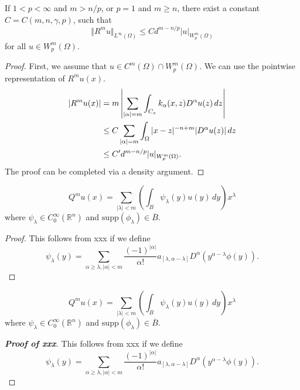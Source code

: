 \documentclass[fontset=none]{ctexart}
\begin{document}
\begin{theorem*}
    If $1<p<\infty$ and $m > n/p$, or $p=1$ and $m \ge n$, there exist a constant $C = C(m,n,\gamma,p)$, such that
    \begin{equation*}
        \Vert R^m u \Vert_{L^\infty(\Omega)} \le C d^{m-n/p} |u|_{W^m_p(\Omega)}
    \end{equation*}
    for all $u \in W^m_p(\Omega)$.
\end{theorem*}
\begin{proof}
    First, we assume that $u \in C^m(\Omega) \cap W^m_p(\Omega)$. We can use the pointwise representation of $R^mu(x)$.
    \begin{align*}
        |R^mu(x)| ={} & m \left| \sum_{|\alpha| = m} \int_{C_x} k_{\alpha}(x,z) D^\alpha u(z)\,dz \right| \notag \\
        \le{}         & C \sum_{|\alpha|=m} \int_{\Omega} |x-z|^{-n+m} |D^\alpha u(z)|\,dz \notag                \\
        \le{}         & C' d^{m-n/p} |u|_{W^m_p(\Omega)}.
    \end{align*}
    The proof can be completed via a density argument.
\end{proof}

\begin{proposition}
    \begin{equation*}
        Q^m u(x) = \sum_{|\lambda| < m} \left( \int_B \psi_\lambda(y) u(y)\,dy \right) x^\lambda
    \end{equation*}
    where $\psi_\lambda \in C_0^\infty(\mathbb{R}^n)$ and $\mathrm{supp}(\phi_\lambda) \in \overline{B}$.
\end{proposition}
\begin{proof}
    This follows from xxx if we define
    \begin{equation*}
        \psi_\lambda(y) = \sum_{\alpha \ge \lambda,|\alpha|<m}
        \frac{(-1)^{|\alpha|}}{\alpha !} a_{[\lambda,\alpha-\lambda]} D^\alpha(y^{\alpha-\lambda} \phi(y)).
    \end{equation*}
\end{proof}

\begin{proposition}[xxx]
    \begin{equation*}
        Q^m u(x) = \sum_{|\lambda| < m} \left( \int_B \psi_\lambda(y) u(y)\,dy \right) x^\lambda
    \end{equation*}
    where $\psi_\lambda \in C_0^\infty(\mathbb{R}^n)$ and $\mathrm{supp}(\phi_\lambda) \in \overline{B}$.
\end{proposition}
\begin{proof}[\upshape\bfseries Proof of xxx]
    This follows from xxx if we define
    \begin{equation*}
        \psi_\lambda(y) = \sum_{\alpha \ge \lambda,|\alpha|<m}
        \frac{(-1)^{|\alpha|}}{\alpha !} a_{[\lambda,\alpha-\lambda]} D^\alpha(y^{\alpha-\lambda} \phi(y)).
    \end{equation*}
\end{proof}
\end{document}
